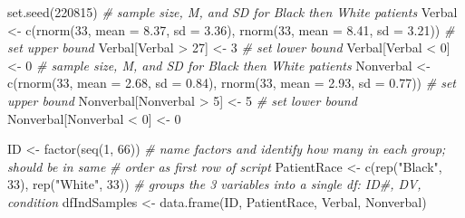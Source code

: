 \documentclass[
  11pt,
]{book}
\newenvironment{Shaded}{\begin{snugshade}}{\end{snugshade}}
\newcommand{\AttributeTok}[1]{\textcolor[rgb]{0.77,0.63,0.00}{#1}}
\newcommand{\CommentTok}[1]{\textcolor[rgb]{0.56,0.35,0.01}{\textit{#1}}}
\newcommand{\DecValTok}[1]{\textcolor[rgb]{0.00,0.00,0.81}{#1}}
\newcommand{\FloatTok}[1]{\textcolor[rgb]{0.00,0.00,0.81}{#1}}
\newcommand{\FunctionTok}[1]{\textcolor[rgb]{0.00,0.00,0.00}{#1}}
\newcommand{\NormalTok}[1]{#1}
\newcommand{\OtherTok}[1]{\textcolor[rgb]{0.56,0.35,0.01}{#1}}
\newcommand{\SpecialCharTok}[1]{\textcolor[rgb]{0.00,0.00,0.00}{#1}}
\newcommand{\StringTok}[1]{\textcolor[rgb]{0.31,0.60,0.02}{#1}}
\begin{document}
\begin{Shaded}
\begin{Highlighting}[]
\FunctionTok{set.seed}\NormalTok{(}\DecValTok{220815}\NormalTok{)}
\CommentTok{\# sample size, M, and SD for Black then White patients}
\NormalTok{Verbal }\OtherTok{\textless{}{-}} \FunctionTok{c}\NormalTok{(}\FunctionTok{rnorm}\NormalTok{(}\DecValTok{33}\NormalTok{, }\AttributeTok{mean =} \FloatTok{8.37}\NormalTok{, }\AttributeTok{sd =} \FloatTok{3.36}\NormalTok{), }\FunctionTok{rnorm}\NormalTok{(}\DecValTok{33}\NormalTok{, }\AttributeTok{mean =} \FloatTok{8.41}\NormalTok{, }\AttributeTok{sd =} \FloatTok{3.21}\NormalTok{))}
\CommentTok{\# set upper bound}
\NormalTok{Verbal[Verbal }\SpecialCharTok{\textgreater{}} \DecValTok{27}\NormalTok{] }\OtherTok{\textless{}{-}} \DecValTok{3}
\CommentTok{\# set lower bound}
\NormalTok{Verbal[Verbal }\SpecialCharTok{\textless{}} \DecValTok{0}\NormalTok{] }\OtherTok{\textless{}{-}} \DecValTok{0}
\CommentTok{\# sample size, M, and SD for Black then White patients}
\NormalTok{Nonverbal }\OtherTok{\textless{}{-}} \FunctionTok{c}\NormalTok{(}\FunctionTok{rnorm}\NormalTok{(}\DecValTok{33}\NormalTok{, }\AttributeTok{mean =} \FloatTok{2.68}\NormalTok{, }\AttributeTok{sd =} \FloatTok{0.84}\NormalTok{), }\FunctionTok{rnorm}\NormalTok{(}\DecValTok{33}\NormalTok{, }\AttributeTok{mean =} \FloatTok{2.93}\NormalTok{,}
    \AttributeTok{sd =} \FloatTok{0.77}\NormalTok{))}
\CommentTok{\# set upper bound}
\NormalTok{Nonverbal[Nonverbal }\SpecialCharTok{\textgreater{}} \DecValTok{5}\NormalTok{] }\OtherTok{\textless{}{-}} \DecValTok{5}
\CommentTok{\# set lower bound}
\NormalTok{Nonverbal[Nonverbal }\SpecialCharTok{\textless{}} \DecValTok{0}\NormalTok{] }\OtherTok{\textless{}{-}} \DecValTok{0}

\NormalTok{ID }\OtherTok{\textless{}{-}} \FunctionTok{factor}\NormalTok{(}\FunctionTok{seq}\NormalTok{(}\DecValTok{1}\NormalTok{, }\DecValTok{66}\NormalTok{))}
\CommentTok{\# name factors and identify how many in each group; should be in same}
\CommentTok{\# order as first row of script}
\NormalTok{PatientRace }\OtherTok{\textless{}{-}} \FunctionTok{c}\NormalTok{(}\FunctionTok{rep}\NormalTok{(}\StringTok{"Black"}\NormalTok{, }\DecValTok{33}\NormalTok{), }\FunctionTok{rep}\NormalTok{(}\StringTok{"White"}\NormalTok{, }\DecValTok{33}\NormalTok{))}
\CommentTok{\# groups the 3 variables into a single df: ID\#, DV, condition}
\NormalTok{dfIndSamples }\OtherTok{\textless{}{-}} \FunctionTok{data.frame}\NormalTok{(ID, PatientRace, Verbal, Nonverbal)}
\end{Highlighting}
\end{Shaded}
\end{document}

